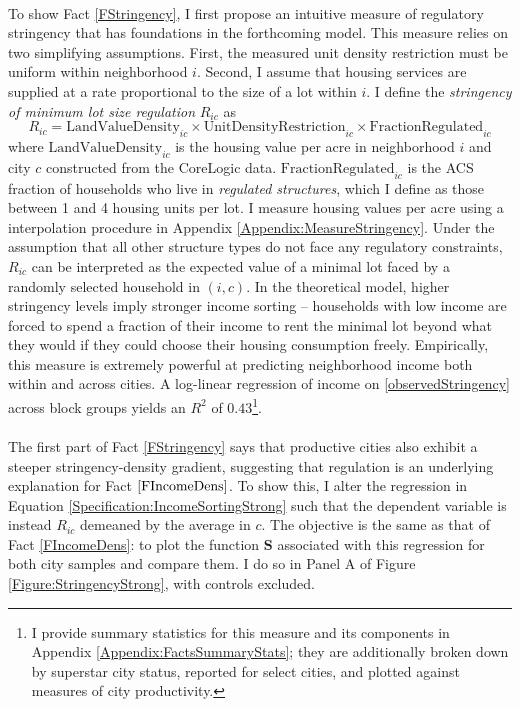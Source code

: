 \documentclass[12pt]{article}
\begin{document}
	\paragraph*{} 
	To show Fact \ref{FStringency}, I first propose an intuitive measure of regulatory stringency that has foundations in the forthcoming model. This measure relies on two simplifying assumptions. First, the measured unit density restriction must be uniform within neighborhood $i$. Second, I assume that housing services are supplied at a rate proportional to the size of a lot within $i$. I define the \textit{stringency of minimum lot size regulation} $R_{ic}$ as
	\begin{equation}\label{observedStringency}
		R_{ic} = \text{LandValueDensity}_{ic} \times \text{UnitDensityRestriction}_{ic} \times \text{FractionRegulated}_{ic}
	\end{equation}
	where $\text{LandValueDensity}_{ic}$ is the housing value per acre in neighborhood $i$ and city $c$ constructed from the CoreLogic data. $\text{FractionRegulated}_{ic}$ is the ACS fraction of households who live in \textit{regulated structures}, which I define as those between 1 and 4 housing units per lot. I measure housing values per acre using a interpolation procedure in Appendix \ref{Appendix:MeasureStringency}. Under the assumption that all other structure types do not face any regulatory constraints, $R_{ic}$ can be interpreted as the expected value of a minimal lot faced by a randomly selected household in $(i, c)$. In the theoretical model, higher stringency levels imply stronger income sorting -- households with low income are forced to spend a fraction of their income to rent the minimal lot beyond what they would if they could choose their housing consumption freely. Empirically, this measure is extremely powerful at predicting neighborhood income both within and across cities. A log-linear regression of income on \eqref{observedStringency} across block groups yields an $R^{2}$ of $0.43$\footnote {I provide summary statistics for this measure and its components in Appendix \ref{Appendix:FactsSummaryStats}; they are additionally broken down by superstar city status, reported for select cities, and plotted against measures of city productivity.}.
	
	\paragraph*{}
	The first part of Fact \ref{FStringency} says that productive cities also exhibit a steeper stringency-density gradient, suggesting that regulation is an underlying explanation for Fact $\ref{FIncomeDens}$. To show this, I alter the regression in Equation \eqref{Specification:IncomeSortingStrong} such that the dependent variable is instead $R_{ic}$ demeaned by the average in $c$. The objective is the same as that of Fact \ref{FIncomeDens}: to plot the function $\mathbf{S}$ associated with this regression for both city samples and compare them. I do so in Panel A of Figure \ref{Figure:StringencyStrong}, with controls excluded. 
	
\end{document}
